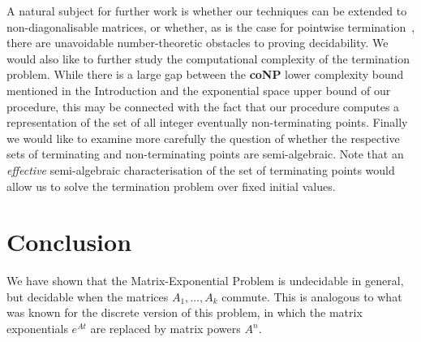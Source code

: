 A natural subject for further work is whether our techniques can be
extended to non-diagonalisable matrices, or whether, as is the case
for pointwise termination~\cite{OW14:SODA}, there are unavoidable
number-theoretic obstacles to proving decidability.  We would also like
to further study the computational complexity of the termination
problem.  While there is a large gap between the \textbf{coNP} lower
complexity bound mentioned in the Introduction and the exponential
space upper bound of our procedure, this may be connected with the
fact that our procedure computes a representation of the set of all
integer eventually non-terminating points. Finally we would like to
examine more carefully the question of whether the respective sets of
terminating and non-terminating points are semi-algebraic.  Note that
an \emph{effective} semi-algebraic characterisation of the set of
terminating points would allow us to solve the termination problem
over fixed initial values.




\section{Conclusion}

We have shown that the Matrix-Exponential Problem is undecidable in
general, but decidable when the matrices $A_{1}, \ldots, A_{k}$ commute.
This is analogous to what was known for the discrete version
of this problem, in which the matrix exponentials $e^{At}$ are
replaced by matrix powers $A^n$.

